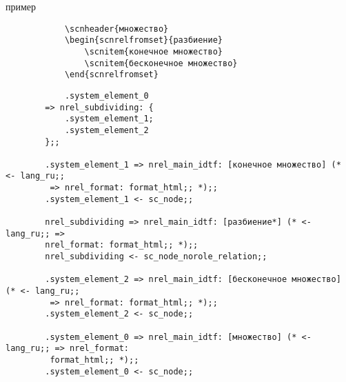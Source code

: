 \begin{scnrelfromlist}{пример}
	{
		\begin{verbatim}
			\scnheader{множество}
			\begin{scnrelfromset}{разбиение}
				\scnitem{конечное множество}
				\scnitem{бесконечное множество}
			\end{scnrelfromset}
		\end{verbatim}
	}
	{
		\begin{verbatim}
			.system_element_0
		=> nrel_subdividing: {
			.system_element_1;
			.system_element_2
		};;

		.system_element_1 => nrel_main_idtf: [конечное множество] (* <- lang_ru;;
		 => nrel_format: format_html;; *);;
		.system_element_1 <- sc_node;;
		
		nrel_subdividing => nrel_main_idtf: [разбиение*] (* <- lang_ru;; =>
		nrel_format: format_html;; *);;
		nrel_subdividing <- sc_node_norole_relation;;

		.system_element_2 => nrel_main_idtf: [бесконечное множество] (* <- lang_ru;;
		 => nrel_format: format_html;; *);;
		.system_element_2 <- sc_node;;
		
		.system_element_0 => nrel_main_idtf: [множество] (* <- lang_ru;; => nrel_format:
		 format_html;; *);;
		.system_element_0 <- sc_node;;

		\end{verbatim}
	}
\end{scnrelfromlist}
